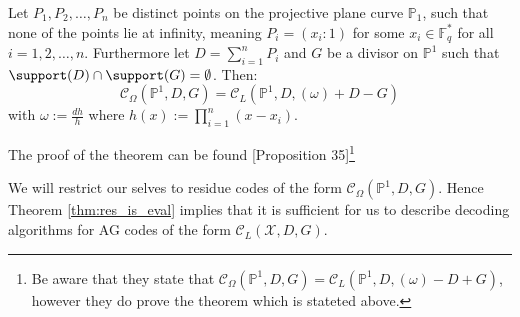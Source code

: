 \begin{theorem}\label{thm:res_is_eval}
  Let $P_1, P_2, \ldots, P_{n}$ be distinct points on the projective plane curve $\mathbb{P}_1$, such that none of the points lie at infinity, meaning $P_i = (x_i : 1)$ for some $x_i \in \mathbb{F}_q^{*}$ for all $i = 1, 2, \ldots, n$. Furthermore let $D = \sum_{i = 1}^n P_i$ and $G$ be a divisor on $\mathbb{P}^{1}$ such that $\support(D) \cap \support(G) = \emptyset$. Then:
  \begin{equation*}
    \mathcal{C}_{\Omega}(\mathbb{P}^1, D, G) = \mathcal{C}_L(\mathbb{P}^1, D, (\omega) + D - G)
  \end{equation*}
  with $\omega := \frac{dh}{h}$ where $h(x) := \prod_{i = 1}^n (x - x_{i})$.
\end{theorem}

The proof of the theorem can be found \cite{AG_codes_and_applications}[Proposition 35]\footnote{Be aware that they state that $\mathcal{C}_{\Omega}(\mathbb{P}^1, D, G) = \mathcal{C}_L(\mathbb{P}^1, D, (\omega) - D + G)$, however they do prove the theorem which is stateted above.}

\begin{remark}
  We will restrict our selves to residue codes of the form $\mathcal{C}_{\Omega}(\mathbb{P}^1, D, G)$.
  Hence Theorem \ref{thm:res_is_eval} implies that it is sufficient for us to describe decoding algorithms for AG codes of the form $\mathcal{C}_L(\mathcal{X}, D, G)$.
\end{remark}

